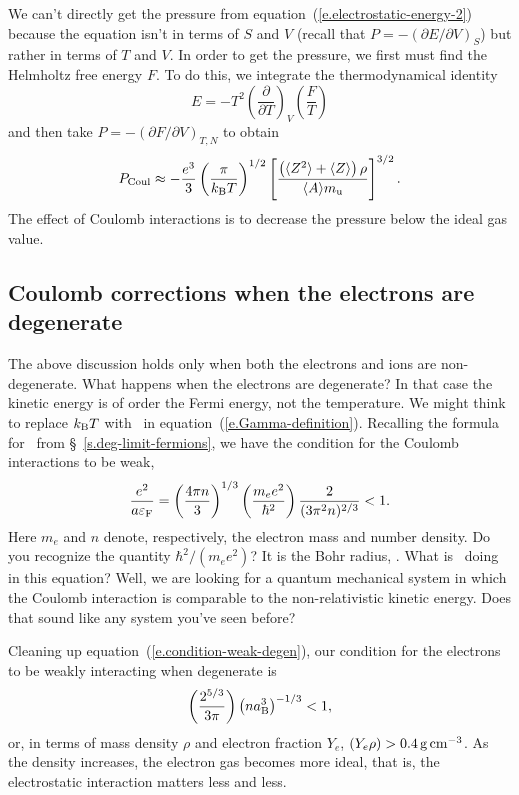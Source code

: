 We can't directly get the pressure from equation~(\ref{e.electrostatic-energy-2}) because the equation isn't in terms of $S$ and $V$ (recall that $P = -(\partial E/\partial V)_{S}$) but rather in terms of $T$ and $V$.
In order to get the pressure, we first must find the Helmholtz free energy $F$. To do this, we integrate the thermodynamical identity
\[ E = -T^{2}\left(\frac{\partial}{\partial T}\right)_{V}\left(\frac{F}{T}\right)
\] 
and then take $P = -(\partial F/\partial V)_{T,N}$ to obtain
\begin{equation}\label{e.pressure-correction}
 P_{\mathrm{Coul}} \approx -\frac{e^{3}}{3}\left(\frac{\pi}{k_\mathrm{B} T}\right)^{1/2}\left[\frac{\left(\langle Z^{2}\rangle+\langle Z\rangle \right)\rho}{\langle A\rangle m_\mathrm{u}}\right]^{3/2}.
\end{equation}
The effect of Coulomb interactions is to decrease the pressure below the ideal gas value.

\subsection[Strongly Coupled Plasmas]{Coulomb corrections when the electrons are degenerate}\label{s.degenerate-coulomb}

The above discussion holds only when both the electrons and ions are non-degenerate.  What happens when the electrons are degenerate?  In that case the kinetic energy is of order the Fermi energy, not the temperature.  We might think to replace $k_\mathrm{B} T$ with \eF\ in equation~(\ref{e.Gamma-definition}). Recalling the formula for \eF\ from \S~\ref{s.deg-limit-fermions}, we have the condition for the Coulomb interactions to be weak,
\begin{equation}\label{e.condition-weak-degen}
\frac{e^{2}}{a \varepsilon_{\mathrm{F}}} = \left(\frac{4\pi n}{3}\right)^{1/3}\left(\frac{m_{e} e^{2}}{\hbar^{2}}\right)\frac{2}{(3\pi^{2} n)^{2/3}} < 1.
\end{equation}
Here $m_{e}$ and $n$ denote, respectively, the electron mass and number density.  Do you recognize the quantity $\hbar^{2}/(m_{e}e^{2})$?  It is the Bohr radius, \abohr.  What is \abohr\ doing in this equation?  Well, we are looking for a quantum mechanical system in which the Coulomb interaction is comparable to the non-relativistic kinetic energy.  Does that sound like any system you've seen before?

Cleaning up equation~(\ref{e.condition-weak-degen}), our condition for the electrons to be weakly interacting when degenerate is
\begin{equation}
\left(\frac{2^{5/3}}{3\pi}\right)\left( n a_{\mathrm{B}}^{3}\right)^{-1/3} < 1,
\end{equation}
or, in terms of mass density $\rho$ and electron fraction $Y_{e}$, $(Y_{e}\rho) > 0.4\,\mathrm{g}\,{\mathrm{c}\mathrm{m}}^{-3}$.  As the density increases, the electron gas becomes more ideal, that is, the electrostatic interaction matters less and less.  

